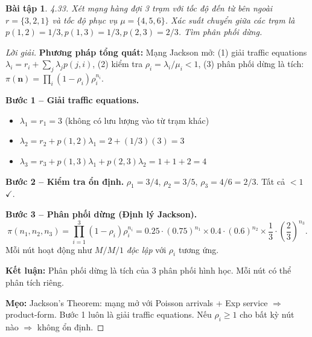 \documentclass[8pt,a4paper]{article}
\newtheorem{exercise}{Bài tập}
\newenvironment{solution}{\begin{proof}[Lời giải]}{\end{proof}}
\begin{document}
\begin{exercise}
4.33. Xét mạng hàng đợi 3 trạm với tốc độ đến từ bên ngoài $r = \{3, 2, 1\}$ và tốc độ phục vụ $\mu = \{4, 5, 6\}$. Xác suất chuyển giữa các trạm là $p(1,2)=1/3, p(1,3)=1/3, p(2,3)=2/3$. Tìm phân phối dừng.
\end{exercise}
\begin{solution}
\textbf{Phương pháp tổng quát:} Mạng Jackson mở: (1) giải traffic equations $\lambda_i = r_i + \sum_j \lambda_j p(j,i)$, (2) kiểm tra $\rho_i = \lambda_i/\mu_i < 1$, (3) phân phối dừng là tích: $\pi(\mathbf{n}) = \prod_i (1-\rho_i)\rho_i^{n_i}$.

\textbf{Bước 1 -- Giải traffic equations.}
\begin{itemize}[nosep]
\item $\lambda_1 = r_1 = 3$ \quad (không có lưu lượng vào từ trạm khác)
\item $\lambda_2 = r_2 + p(1,2)\lambda_1 = 2 + (1/3)(3) = 3$
\item $\lambda_3 = r_3 + p(1,3)\lambda_1 + p(2,3)\lambda_2 = 1 + 1 + 2 = 4$
\end{itemize}

\textbf{Bước 2 -- Kiểm tra ổn định.}
$\rho_1 = 3/4$, $\rho_2 = 3/5$, $\rho_3 = 4/6 = 2/3$. Tất cả $< 1$ $\checkmark$.

\textbf{Bước 3 -- Phân phối dừng (Định lý Jackson).}
\[
\boxed{\pi(n_1, n_2, n_3) = \prod_{i=1}^3 (1-\rho_i)\rho_i^{n_i} = 0.25 \cdot (0.75)^{n_1} \times 0.4 \cdot (0.6)^{n_2} \times \frac{1}{3} \cdot \left(\frac{2}{3}\right)^{n_3}}.
\]
Mỗi nút hoạt động như $M/M/1$ \emph{độc lập} với $\rho_i$ tương ứng.

\textbf{Kết luận:} Phân phối dừng là tích của 3 phân phối hình học. Mỗi nút có thể phân tích riêng.

\textbf{Mẹo:} Jackson's Theorem: mạng mở với Poisson arrivals + Exp service $\Rightarrow$ product-form. Bước 1 luôn là giải traffic equations. Nếu $\rho_i \ge 1$ cho bất kỳ nút nào $\Rightarrow$ không ổn định.
\end{solution}
\end{document}
